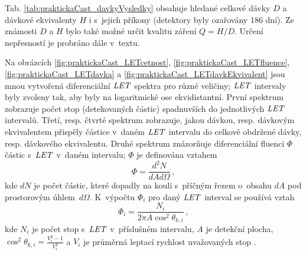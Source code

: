 Tab. \ref{tab:praktickaCast_davkyVysledky} obsahuje hledané celkové dávky $D$ a dávkové ekvivalenty $H$ i s~jejich příkony (detektory byly ozařovány 186 dní). Ze známosti $D$ a $H$ bylo také možné určit kvalitu záření $Q=H/D$. Určení nepřesností je probráno dále v~textu.

Na obrázcích \ref{fig:praktickaCast_LETcetnost}, \ref{fig:praktickaCast_LETfluence}, \ref{fig:praktickaCast_LETdavka} a \ref{fig:praktickaCast_LETdavkEkvivalent} jsou mnou vytvořená diferenciální $\mathit{LET}$ spektra pro různé veličiny; $\mathit{LET}$ intervaly byly zvoleny tak, aby byly na logaritmické ose ekvidistantní. První spektrum zobrazuje počet stop (detekovaných částic) spadnuvších do jednotlivých $\mathit{LET}$ intervalů. Třetí, resp. čtvrté spektrum zobrazuje, jakou dávkou, resp. dávkovým ekvivalentem přispěly částice v~daném $\mathit{LET}$ intervalu do celkově obdržené dávky, resp. dávkového ekvivalentu. Druhé spektrum znázorňuje diferenciální fluenci $\Phi$ částic s~$\mathit{LET}$ v~daném intervalu; $\Phi$ je definována vztahem
\begin{equation}
  \Phi=\frac{d^2N}{dAd\Omega}\,,
  \label{eq:praktickaCast_fluence}
\end{equation}
kde $dN$ je počet částic, které dopadly na kouli s~příčným řezem o~obsahu $dA$ pod prostorovým úhlem~$d\Omega$. K~výpočtu $\Phi_i$ pro daný $\mathit{LET}$ interval se používá vztah
\begin{equation}
  \Phi_i=\frac{N_i}{2\pi A\cos^2\theta_{k,i}}\,,
  \label{eq:praktickaCast_fluenceVypocet}
\end{equation}
kde $N_i$ je počet stop s~$\mathit{LET}$ v~příslušném intervalu, $A$ je detekční plocha, $\cos^2\theta_{k,i}=\frac{V^2_i-1}{V^2_i}$ a $V_i$ je průměrná leptací rychlost uvažovaných stop \cite{ssntd}.

